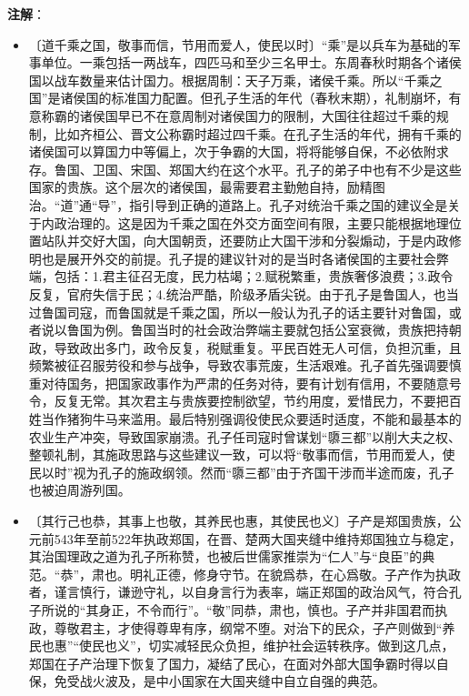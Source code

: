 \documentclass[12pt,UTF-8,openany,a4]{ctexbook}
\begin{document}
\newpage

\begin{Large}
   \noindent \textbf{注解}：
\end{Large}

\vspace{-1em}

\begin{itemize}
    \setlength\itemsep{-0.2em}
    \item〔道千乘之国，敬事而信，节用而爱人，使民以时〕{\yiwen “乘”是以兵车为基础的军事单位。一乘包括一两战车，四匹马和至少三名甲士。东周春秋时期各个诸侯国以战车数量来估计国力。根据周制：天子万乘，诸侯千乘。所以“千乘之国”是诸侯国的标准国力配置。但孔子生活的年代（春秋末期），礼制崩坏，有意称霸的诸侯国早已不在意周制对诸侯国力的限制，大国往往超过千乘的规制，比如齐桓公、晋文公称霸时超过四千乘。在孔子生活的年代，拥有千乘的诸侯国可以算国力中等偏上，次于争霸的大国，将将能够自保，不必依附求存。鲁国、卫国、宋国、郑国大约在这个水平。孔子的弟子中也有不少是这些国家的贵族。这个层次的诸侯国，最需要君主勤勉自持，励精图治。“道”通“导”，指引导到正确的道路上。孔子对统治千乘之国的建议全是关于内政治理的。这是因为千乘之国在外交方面空间有限，主要只能根据地理位置站队并交好大国，向大国朝贡，还要防止大国干涉和分裂煽动，于是内政修明也是展开外交的前提。孔子提的建议针对的是当时各诸侯国的主要社会弊端，包括：1.君主征召无度，民力枯竭；2.赋税繁重，贵族奢侈浪费；3.政令反复，官府失信于民；4.统治严酷，阶级矛盾尖锐。由于孔子是鲁国人，也当过鲁国司寇，而鲁国就是千乘之国，所以一般认为孔子的话主要针对鲁国，或者说以鲁国为例。鲁国当时的社会政治弊端主要就包括公室衰微，贵族把持朝政，导致政出多门，政令反复，税赋重复。平民百姓无人可信，负担沉重，且频繁被征召服劳役和参与战争，导致农事荒废，生活艰难。孔子首先强调要慎重对待国务，把国家政事作为严肃的任务对待，要有计划有信用，不要随意号令，反复无常。其次君主与贵族要控制欲望，节约用度，爱惜民力，不要把百姓当作猪狗牛马来滥用。最后特别强调役使民众要适时适度，不能和最基本的农业生产冲突，导致国家崩溃。孔子任司寇时曾谋划“隳三都”以削大夫之权、整顿礼制，其施政思路与这些建议一致，可以将“敬事而信，节用而爱人，使民以时”视为孔子的施政纲领。然而“隳三都”由于齐国干涉而半途而废，孔子也被迫周游列国。}
    \item〔其行己也恭，其事上也敬，其养民也惠，其使民也义〕{\yiwen 子产是郑国贵族，公元前543年至前522年执政郑国，在晋、楚两大国夹缝中维持郑国独立与稳定，其治国理政之道为孔子所称赞，也被后世儒家推崇为“仁人”与“良臣”的典范。“恭”，肃也。明礼正德，修身守节。在貌爲恭，在心爲敬。子产作为执政者，谨言慎行，谦逊守礼，以自身言行为表率，端正郑国的政治风气，符合孔子所说的“其身正，不令而行”。“敬”同恭，肃也，慎也。子产并非国君而执政，尊敬君主，才使得尊卑有序，纲常不堕。对治下的民众，子产则做到“养民也惠”“使民也义”，切实减轻民众负担，维护社会运转秩序。做到这几点，郑国在子产治理下恢复了国力，凝结了民心，在面对外部大国争霸时得以自保，免受战火波及，是中小国家在大国夹缝中自立自强的典范。}

\end{itemize}
\end{document}
